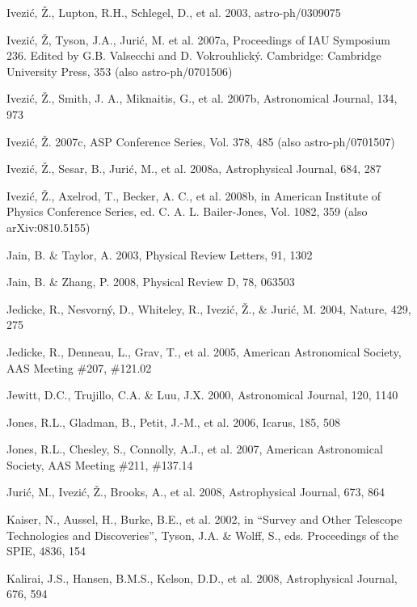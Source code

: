 \documentclass{emulateapj}
\begin{document}
\begin{thebibliography}{}
\bibitem[()]{} Ivezi\'c, \v Z., Lupton, R.H., Schlegel, D., et al. 2003, astro-ph/0309075

\bibitem[()]{} Ivezi\'{c}, \v{Z}, Tyson, J.A., Juri\'{c}, M. et al. 2007a, Proceedings of IAU Symposium 
             236. Edited by G.B. Valsecchi and D. Vokrouhlick\'{y}. Cambridge: Cambridge University 
             Press, 353 (also astro-ph/0701506)

\bibitem[()]{} Ivezi\'{c}, \v{Z}., Smith, J. A., Miknaitis, G., et al. 2007b, Astronomical Journal, 134, 973

\bibitem[()]{} Ivezi\'{c}, \v{Z}. 2007c, ASP Conference Series, Vol. 378, 485 (also astro-ph/0701507)

\bibitem[()]{} Ivezi\'c, \v Z., Sesar, B., Juri\'{c}, M., et al. 2008a, Astrophysical Journal, 684, 287

\bibitem[()]{} Ivezi\'c, \v Z., Axelrod, T., Becker, A. C., et al. 2008b, in American Institute of
                           Physics Conference Series, ed. C. A. L. Bailer-Jones, Vol. 1082, 359 (also arXiv:0810.5155)

\bibitem[()]{} Jain, B. \& Taylor, A. 2003, Physical Review Letters, 91, 1302	

\bibitem[()]{} Jain, B. \& Zhang, P. 2008, Physical Review D, 78, 063503 
 
\bibitem[()]{} Jedicke, R., Nesvorn{\'y}, D., Whiteley, R., Ivezi{\'c}, {\v Z}., \& Juri{\'c}, M. 2004, 
             Nature, 429, 275 

\bibitem[()]{} Jedicke, R., Denneau, L., Grav, T., et al. 2005, American Astronomical Society, AAS 
             Meeting \#207, \#121.02

\bibitem[()]{} Jewitt, D.C., Trujillo, C.A. \& Luu, J.X. 2000, Astronomical Journal, 120, 1140

\bibitem[()]{} Jones, R.L., Gladman, B., Petit, J.-M., et al. 2006, Icarus, 185, 508

\bibitem[()]{} Jones, R.L., Chesley, S., Connolly, A.J., et al. 2007, American Astronomical Society, AAS 
             Meeting \#211, \#137.14

\bibitem[()]{} Juri\'{c}, M., Ivezi\'c, \v Z., Brooks, A., et al. 2008, Astrophysical Journal, 673, 864

\bibitem[()]{} Kaiser, N., Aussel, H., Burke, B.E., et al. 2002, in ``Survey and Other Telescope 
             Technologies and Discoveries'', Tyson, J.A. \& Wolff, S.,
             eds. Proceedings of the SPIE, 4836, 154 

\bibitem[()]{} Kalirai, J.S., Hansen, B.M.S., Kelson, D.D., et al. 2008, Astrophysical Journal, 676, 594


\end{thebibliography}
\end{document}
